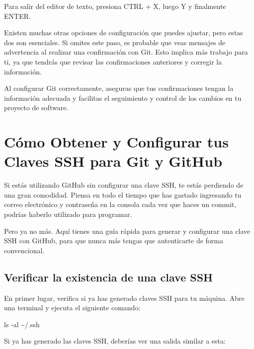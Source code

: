 \documentclass[
  letterpaper,
  DIV=11,
  numbers=noendperiod]{scrartcl}
\newenvironment{Shaded}{}{}
\newcommand{\AttributeTok}[1]{\textcolor[rgb]{0.84,0.23,0.29}{#1}}
\newcommand{\FunctionTok}[1]{\textcolor[rgb]{0.44,0.26,0.76}{#1}}
\newcommand{\NormalTok}[1]{\textcolor[rgb]{0.14,0.16,0.18}{#1}}
\begin{document}
Para salir del editor de texto, presiona CTRL + X, luego Y y finalmente
ENTER.

Existen muchas otras opciones de configuración que puedes ajustar, pero
estas dos son esenciales. Si omites este paso, es probable que veas
mensajes de advertencia al realizar una confirmación con Git. Esto
implica más trabajo para ti, ya que tendrás que revisar las
confirmaciones anteriores y corregir la información.

Al configurar Git correctamente, aseguras que tus confirmaciones tengan
la información adecuada y facilitas el seguimiento y control de los
cambios en tu proyecto de software.

\hypertarget{cuxf3mo-obtener-y-configurar-tus-claves-ssh-para-git-y-github}{%
\section{Cómo Obtener y Configurar tus Claves SSH para Git y
GitHub}\label{cuxf3mo-obtener-y-configurar-tus-claves-ssh-para-git-y-github}}

Si estás utilizando GitHub sin configurar una clave SSH, te estás
perdiendo de una gran comodidad. Piensa en todo el tiempo que has
gastado ingresando tu correo electrónico y contraseña en la consola cada
vez que haces un commit, podrías haberlo utilizado para programar.

Pero ya no más. Aquí tienes una guía rápida para generar y configurar
una clave SSH con GitHub, para que nunca más tengas que autenticarte de
forma convencional.

\hypertarget{verificar-la-existencia-de-una-clave-ssh}{%
\subsection{Verificar la existencia de una clave
SSH}\label{verificar-la-existencia-de-una-clave-ssh}}

En primer lugar, verifica si ya has generado claves SSH para tu máquina.
Abre una terminal y ejecuta el siguiente comando:

\begin{Shaded}
\begin{Highlighting}[]
\FunctionTok{ls} \AttributeTok{{-}al}\NormalTok{ \textasciitilde{}/.ssh}
\end{Highlighting}
\end{Shaded}

Si ya has generado las claves SSH, deberías ver una salida similar a
esta:
\end{document}
